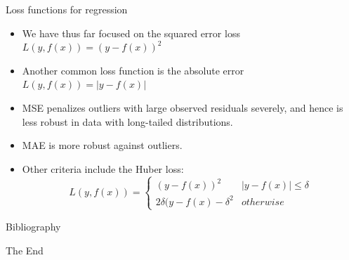 \documentclass[aspectratio=169]{beamer}
\begin{document}
\begin{frame}{Loss functions for regression}
    \begin{itemize}
        \item We have thus far focused on the squared error loss $L(y, f(x)) = (y - f(x))^2$
        \item Another common loss function is the absolute error $L(y, f(x)) = |y - f(x)|$
        \item MSE penalizes outliers with large observed residuals severely, and hence is less robust in data with long-tailed distributions.
        \item MAE is more robust against outliers.
        \item Other criteria include the Huber loss:
        \begin{equation*}
            L(y, f(x)) = \left\{ \begin{array}{cc}
                (y - f(x))^2 & |y-f(x)| \leq \delta \\
                2\delta (y-f(x) - \delta^2 & otherwise
            \end{array}\right.
        \end{equation*}
    \end{itemize}
\end{frame}



\begin{frame}[allowframebreaks]{Bibliography}
    
    
\end{frame}


\begin{frame}
    \Huge{\centerline{The End}}
\end{frame}
\end{document}
